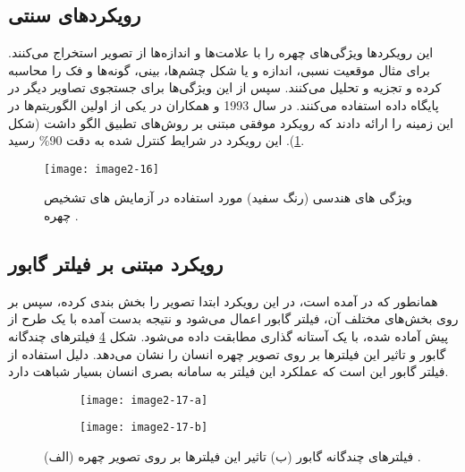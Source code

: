 \subsection{رویکرد‌های سنتی}
این رویکردها ویژگی‌های چهره را با علامت‌ها و اندازه‌ها از تصویر استخراج می‌کنند. برای مثال موقعیت نسبی، اندازه و یا شکل چشم‌ها، بینی، گونه‌‌ها و فک را محاسبه کرده و تجزیه و تحلیل می‌کنند. سپس از این ویژگی‌ها برای جستجوی تصاویر دیگر در پایگاه داده استفاده می‌کنند. در سال 1993  و همکاران در \cite{254061} یکی از اولین الگوریتم‌ها در این زمینه را ارائه دادند که رویکرد‌ موفقی مبتنی بر روش‌های تطبیق الگو داشت (شکل \ref{image2-16}). این رویکرد در شرایط کنترل شده به دقت 90\% رسید.
 
\begin{figure}[h]
\centering
  \texttt{[image: image2-16]}
  \caption{ویژگی های هندسی (رنگ سفید) مورد استفاده در آزمایش های تشخیص چهره \cite{254061}.}
  \label{image2-16}
\end{figure}

\subsection{رویکرد مبتنی بر فیلتر گابور ‌}
همانطور که در \cite{ABATE20071885} آمده است، در این رویکرد ابتدا تصویر را بخش بندی  کرده، سپس بر روی بخش‌های مختلف آن، فیلتر گابور  اعمال می‌شود و نتیجه بدست آمده با یک طرح از پیش آماده شده، با یک آستانه گذاری مطابقت داده می‌شود. شکل \ref{image2-17} فیلترهای چندگانه گابور و تاثیر این فیلترها بر روی تصویر چهره انسان را نشان می‌دهد. دلیل استفاده از فیلتر گابور این است که عملکرد این فیلتر به سامانه بصری انسان بسیار شباهت دارد. 
 	 
\begin{figure}
\begin{subfigure}{.5\textwidth}
  \centering
  \texttt{[image: image2-17-a]}
  \label{image2-17-a}
\end{subfigure}
\begin{subfigure}{.5\textwidth}
  \centering
  \texttt{[image: image2-17-b]}
  \label{image2-17-b}
\end{subfigure}
  \caption{(الف) فیلترهای چندگانه گابور (ب) تاثیر این فیلترها بر روی تصویر چهره \cite{ABATE20071885}.}
\label{image2-17}
\end{figure}


